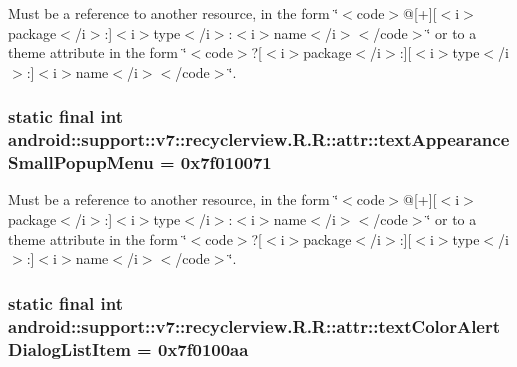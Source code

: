 Must be a reference to another resource, in the form \char`\"{}$<$code$>$@\mbox{[}+\mbox{]}\mbox{[}$<$i$>$package$<$/i$>$:\mbox{]}$<$i$>$type$<$/i$>$:$<$i$>$name$<$/i$>$$<$/code$>$\char`\"{} or to a theme attribute in the form \char`\"{}$<$code$>$?\mbox{[}$<$i$>$package$<$/i$>$:\mbox{]}\mbox{[}$<$i$>$type$<$/i$>$:\mbox{]}$<$i$>$name$<$/i$>$$<$/code$>$\char`\"{}. \hypertarget{classandroid_1_1support_1_1v7_1_1recyclerview_1_1_r_1_1attr_38fba96dfa750a28b474d905a9693839}{
\subsubsection[{textAppearanceSmallPopupMenu}]{\setlength{\rightskip}{0pt plus 5cm}static final int android::support::v7::recyclerview.R.R::attr::textAppearanceSmallPopupMenu = 0x7f010071}}
\label{classandroid_1_1support_1_1v7_1_1recyclerview_1_1_r_1_1attr_38fba96dfa750a28b474d905a9693839}


Must be a reference to another resource, in the form \char`\"{}$<$code$>$@\mbox{[}+\mbox{]}\mbox{[}$<$i$>$package$<$/i$>$:\mbox{]}$<$i$>$type$<$/i$>$:$<$i$>$name$<$/i$>$$<$/code$>$\char`\"{} or to a theme attribute in the form \char`\"{}$<$code$>$?\mbox{[}$<$i$>$package$<$/i$>$:\mbox{]}\mbox{[}$<$i$>$type$<$/i$>$:\mbox{]}$<$i$>$name$<$/i$>$$<$/code$>$\char`\"{}. \hypertarget{classandroid_1_1support_1_1v7_1_1recyclerview_1_1_r_1_1attr_4d42a4a3f4a1c096b6c1dd3b959fe6d5}{
\subsubsection[{textColorAlertDialogListItem}]{\setlength{\rightskip}{0pt plus 5cm}static final int android::support::v7::recyclerview.R.R::attr::textColorAlertDialogListItem = 0x7f0100aa}}
\label{classandroid_1_1support_1_1v7_1_1recyclerview_1_1_r_1_1attr_4d42a4a3f4a1c096b6c1dd3b959fe6d5}


